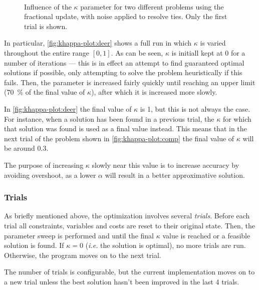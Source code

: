 \begin{figure}[p]
	\centering
	\\
	\caption{Influence of the \(\kappa\) parameter for two different problems using the fractional update, with noise applied to resolve ties. Only the first trial is shown.}
	\label{fig:khappa-plot}
\end{figure}

In particular, \cref{fig:khappa-plot:deer} shows a full run in which \(\kappa\) is varied throughout the entire range \([0,1]\).
As can be seen, \(\kappa\) is initiall kept at 0 for a number of iterations --- this is in effect an attempt to find guaranteed optimal solutions if possible, only attempting to solve the problem heuristically if this fails.
Then, the parameter is increased fairly quickly until reaching an upper limit (\SI{70}{\percent} of the final value of \(\kappa\)), after which it is increased more slowly.

In \cref{fig:khappa-plot:deer} the final value of \(\kappa\) is 1, but this is not always the case.
For instance, when a solution has been found in a previous trial, the \(\kappa\) for which that solution was found is used as a final value instead.
This means that in the next trial of the problem shown in \cref{fig:khappa-plot:comp} the final value of \(\kappa\) will be around \num{0.3}.

The purpose of increasing \(\kappa\) slowly near this value is to increase accuracy by avoiding overshoot, as a lower \(\alpha\) will result in a better approximative solution.

\subsubsection{Trials}
As briefly mentioned above, the optimization involves several \emph{trials}.
Before each trial all constraints, variables and costs are reset to their original state.
Then, the parameter sweep is performed and until the final \(\kappa\) value is reached or a feasible solution is found.
If \(\kappa=0\) (\emph{i.e.} the solution is optimal), no more trials are run.
Otherwise, the program moves on to the next trial.

The number of trials is configurable, but the current implementation moves on to a new trial unless the best solution hasn't been improved in the last 4 trials.
